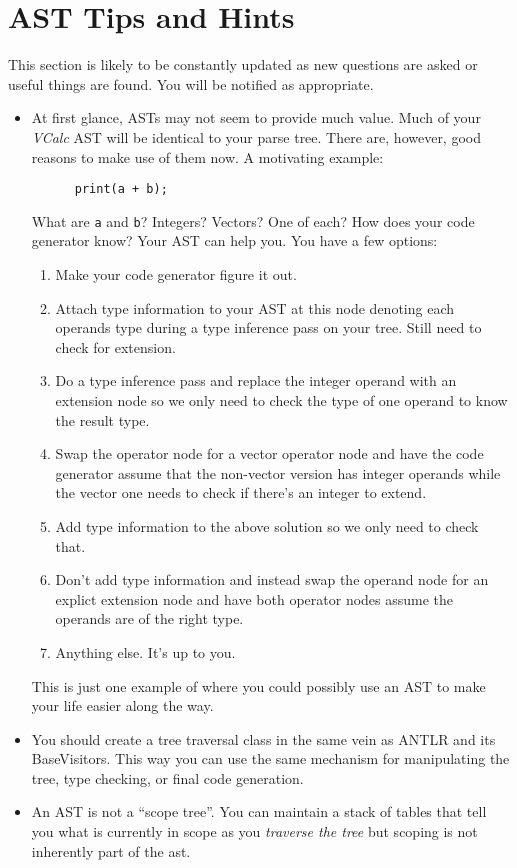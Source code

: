 \documentclass{article}
\newcommand{\code}[1]{\texttt{\textmd{#1}}}
\begin{document}
\section{AST Tips and Hints}
This section is likely to be constantly updated as new questions are asked or useful things are
found. You will be notified as appropriate.

\begin{itemize}
  \item
    At first glance, ASTs may not seem to provide much value. Much of your \textit{VCalc} AST will
    be identical to your parse tree. There are, however, good reasons to make use of them now. A
    motivating example:
    \begin{lstlisting}
      print(a + b);
    \end{lstlisting}
    What are \code{a} and \code{b}? Integers? Vectors? One of each? How does your code generator
    know? Your AST can help you. You have a few options:
    \begin{enumerate}
      \item
        Make your code generator figure it out.
      \item
        Attach type information to your AST at this node denoting each operands type during a type
        inference pass on your tree. Still need to check for extension.
      \item
        Do a type inference pass and replace the integer operand with an extension node so we only
        need to check the type of one operand to know the result type.
      \item
        Swap the operator node for a vector operator node and have the code generator assume that
        the non-vector version has integer operands while the vector one needs to check if there's
        an integer to extend.
      \item
        Add type information to the above solution so we only need to check that.
      \item
        Don't add type information and instead swap the operand node for an explict extension node
        and have both operator nodes assume the operands are of the right type.
      \item
        Anything else. It's up to you.
    \end{enumerate}
    This is just one example of where you could possibly use an AST to make your life easier along
    the way.
  \item
    You should create a tree traversal class in the same vein as ANTLR and its BaseVisitors. This
    way you can use the same mechanism for manipulating the tree, type checking, or final code
    generation.
  \item
    An AST is not a ``scope tree''. You can maintain a stack of tables that tell you what is
    currently in scope as you \textit{traverse the tree} but scoping is not inherently part of the
    ast.
\end{itemize}
\end{document}
